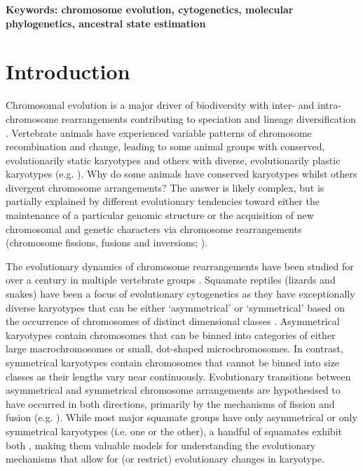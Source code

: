 \documentclass[a4paper, 12pt]{article}
\begin{document}
\textbf{Keywords: chromosome evolution, cytogenetics, molecular phylogenetics, ancestral state estimation}


\section{Introduction}\label{main}

Chromosomal evolution is a major driver of biodiversity with inter- and intra-chromosome rearrangements contributing to speciation and lineage diversification \citep{pellestor2020chromoanagenesis}. 
Vertebrate animals have experienced variable patterns of chromosome recombination and change, leading to some animal groups with conserved, evolutionarily static karyotypes and others with diverse, evolutionarily plastic karyotypes (e.g. \citealt{graphodatsky2011genome,neto2011extensive,mezzasalma2019changes,degrandi2020distribution,mayrose2021evolution}).
Why do some animals have conserved karyotypes whilst others divergent chromosome arrangements? 
The answer is likely complex, but is partially explained by different evolutionary tendencies toward either the maintenance of a particular genomic structure or the acquisition of new chromosomal and genetic characters via chromosome rearrangements (chromosome fissions, fusions and inversions; \citealt{crombach2007chromosome,amorim2021new}).

The evolutionary dynamics of chromosome rearrangements have been studied for over a century in multiple vertebrate groups \citep{damas2021vertebrate}. 
Squamate reptiles (lizards and snakes) have been a focus of evolutionary cytogenetics as they have exceptionally diverse karyotypes that can be either ‘asymmetrical’ or ‘symmetrical’ based on the occurrence of chromosomes of distinct dimensional classes \citep{stebbins1950chapter,white1973}. 
Asymmetrical karyotypes contain chromosomes that can be binned into categories of either large macrochromosomes or small, dot-shaped microchromosomes.
In contrast, symmetrical karyotypes contain chromosomes that cannot be binned into size classes as their lengths vary near continuously. 
Evolutionary transitions between asymmetrical and symmetrical chromosome arrangements are hypothesised to have occurred in both directions, primarily by the mechanisms of fission and fusion (e.g. \citealt{olmo2008trends,srikulnath2015karyotype}). 
While most major squamate groups have only asymmetrical or only symmetrical karyotypes (i.e. one or the other), a handful of squamates exhibit both \citep{mezzasalma2021lizards}, making them valuable models for understanding the evolutionary mechanisms that allow for (or restrict) evolutionary changes in karyotype.    
\end{document}
